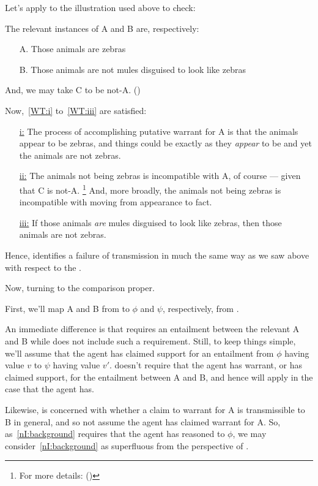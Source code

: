 \begin{note}
  Let's apply \wrt{} to the illustration used above to check:

  The relevant instances of A and B are, respectively:
  \begin{itemize}
  \item[A.] Those animals are zebras
  \item[B.] Those animals are not mules disguised to look like zebras
  \end{itemize}
  And, we may take C to be not-A. (\Citeyear[90]{Wright:2011wn})

  Now,~\ref{WT:i} to~\ref{WT:iii} are satisfied:

  \begin{itemize}
  \item[{\hyperref[WT:i]{i:}}] The process of accomplishing putative warrant for A is that the animals appear to be zebras, and things could be exactly as they \emph{appear} to be and yet the animals are not zebras.
  \item[{\hyperref[WT:ii]{ii:}}] The animals not being zebras is incompatible with A, of course --- given that C is not-A.\nolinebreak
    \footnote{
      For more details: (\Citeyear[90--96]{Wright:2011wn})
    }
    And, more broadly, the animals not being zebras is incompatible with moving from appearance to fact.
  \item[{\hyperref[WT:iii]{iii:}}] If those animals \emph{are} mules disguised to look like zebras, then those animals are not zebras.
  \end{itemize}
  Hence, \wrt{} identifies a failure of transmission in much the same way as we saw above with respect to the \widt{}.
\end{note}

\begin{note}[Entailment]
  Now, turning to the comparison proper.

  First, we'll map A and B from \wrt{} to \(\phi\) and \(\psi\), respectively, from \nI{}.

  An immediate difference is that \wrt{} requires an entailment between the relevant A and B while \nI{} does not include such a requirement.
  Still, to keep things simple, we'll assume that the agent has claimed support for an entailment from \(\phi\) having value \(v\) to \(\psi\) having value \(v'\).
  \wrt{} doesn't require that the agent has warrant, or has claimed support, for the entailment between A and B, and hence will apply in the case that the agent has.

  Likewise, \wrt{} is concerned with whether a claim to warrant for A is transmissible to B in general, and so not assume the agent has claimed warrant for A.
  So, as~\ref{nI:background} requires that the agent has reasoned to \(\phi\), we may consider~\ref{nI:background} as superfluous from the perspective of \wrt{}.
\end{note}

